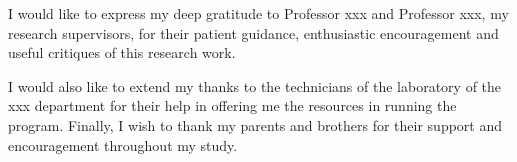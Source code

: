 I would like to express my deep gratitude to Professor xxx and
Professor xxx, my research supervisors, for their patient
guidance, enthusiastic encouragement and useful critiques of
this research work.

I would also like to extend my thanks to the technicians of the
laboratory of the xxx department for their help in offering me the
resources in running the program.
Finally, I wish to thank my parents and brothers for their support
and encouragement throughout my study.

